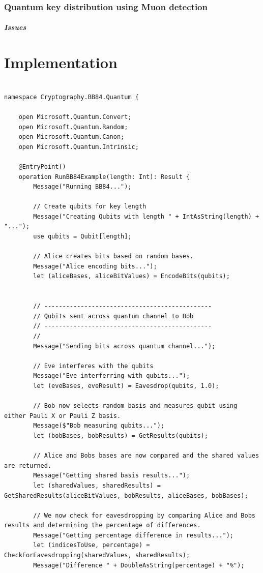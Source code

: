 \documentclass{article}
\begin{document}
\subsubsection{Quantum key distribution using Muon detection }


\subparagraph{Issues}


\section{Implementation}

\begin{lstlisting}[language={[Sharp]C}, caption={Q\# Microsoft Quantum Development Kit}, label={Script}]

namespace Cryptography.BB84.Quantum {

    open Microsoft.Quantum.Convert;
    open Microsoft.Quantum.Random;
    open Microsoft.Quantum.Canon;
    open Microsoft.Quantum.Intrinsic;
    
    @EntryPoint()
    operation RunBB84Example(length: Int): Result {
        Message("Running BB84...");

        // Create qubits for key length
        Message("Creating Qubits with length " + IntAsString(length) + "...");
        use qubits = Qubit[length];

        // Alice creates bits based on random bases.
        Message("Alice encoding bits...");
        let (aliceBases, aliceBitValues) = EncodeBits(qubits);


        // ----------------------------------------------
        // Qubits sent across quantum channel to Bob
        // ----------------------------------------------
        //
        Message("Sending bits across quantum channel...");

        // Eve interferes with the qubits
        Message("Eve interferring with qubits...");
        let (eveBases, eveResult) = Eavesdrop(qubits, 1.0);

        // Bob now selects random basis and measures qubit using either Pauli X or Pauli Z basis.
        Message($"Bob measuring qubits...");
        let (bobBases, bobResults) = GetResults(qubits);

        // Alice and Bobs bases are now compared and the shared values are returned.
        Message("Getting shared basis results...");
        let (sharedValues, sharedResults) = GetSharedResults(aliceBitValues, bobResults, aliceBases, bobBases);

        // We now check for eavesdropping by comparing Alice and Bobs results and determining the percentage of differences.
        Message("Getting percentage difference in results...");
        let (indicesToUse, percentage) = CheckForEavesdropping(sharedValues, sharedResults);  
        Message("Difference " + DoubleAsString(percentage) + "%");
         

\end{lstlisting}
\end{document}
